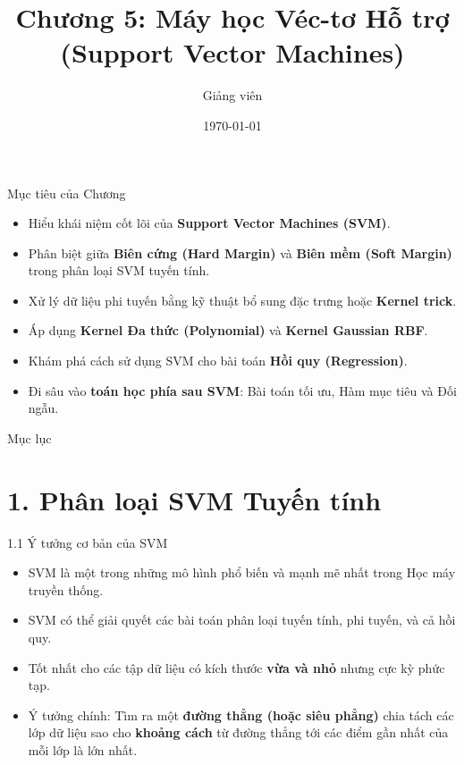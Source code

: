 \documentclass[aspectratio=169, 12pt]{beamer}
\title[ML - Chap 05]{Chương 5: Máy học Véc-tơ Hỗ trợ (Support Vector Machines)}
\author[Giảng viên]{Giảng viên}
\institute[Đại học Đông Á]{Đại học Đông Á}
\date{\today}
\begin{document}
\begin{frame}
    \titlepage
\end{frame}

\begin{frame}{Mục tiêu của Chương}
    \begin{itemize}
        \item Hiểu khái niệm cốt lõi của \textbf{Support Vector Machines (SVM)}.
        \item Phân biệt giữa \textbf{Biên cứng (Hard Margin)} và \textbf{Biên mềm (Soft Margin)} trong phân loại SVM tuyến tính.
        \item Xử lý dữ liệu phi tuyến bằng kỹ thuật bổ sung đặc trưng hoặc \textbf{Kernel trick}.
        \item Áp dụng \textbf{Kernel Đa thức (Polynomial)} và \textbf{Kernel Gaussian RBF}.
        \item Khám phá cách sử dụng SVM cho bài toán \textbf{Hồi quy (Regression)}.
        \item Đi sâu vào \textbf{toán học phía sau SVM}: Bài toán tối ưu, Hàm mục tiêu và Đối ngẫu.
    \end{itemize}
\end{frame}

\begin{frame}{Mục lục}
    \tableofcontents
\end{frame}

\section{1. Phân loại SVM Tuyến tính}

\begin{frame}{1.1 Ý tưởng cơ bản của SVM}
    \begin{itemize}
        \item SVM là một trong những mô hình phổ biến và mạnh mẽ nhất trong Học máy truyền thống.
        \item SVM có thể giải quyết các bài toán phân loại tuyến tính, phi tuyến, và cả hồi quy.
        \item Tốt nhất cho các tập dữ liệu có kích thước \textbf{vừa và nhỏ} nhưng cực kỳ phức tạp.
        \item Ý tưởng chính: Tìm ra một \textbf{đường thẳng (hoặc siêu phẳng)} chia tách các lớp dữ liệu sao cho \textbf{khoảng cách} từ đường thẳng tới các điểm gần nhất của mỗi lớp là lớn nhất.
    \end{itemize}
\end{frame}
\end{document}
